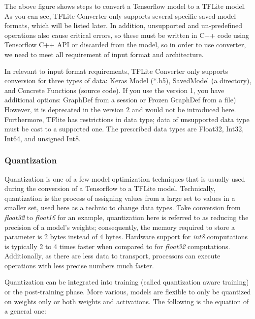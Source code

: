 The above figure shows steps to convert a Tensorflow model to a TFLite model. As you can see, TFLite Converter only supports several specific saved model formats, which will be listed later. In addition, unsupported and un-predefined operations also cause critical errors, so these must be written in C++ code using Tensorflow C++ API or discarded from the model, so in order to use converter, we need to meet all requirement of input format and architecture.\par 

In relevant to input format requirements, TFLite Converter only supports conversion for three types of data: Keras Model (*.h5), SavedModel (a directory), and Concrete Functions (source code). If you use the version 1, you have additional options: GraphDef from a session or Frozen GraphDef from a file) However, it is deprecated in the version 2 and would not be introduced here. Furthermore, TFlite has restrictions in data type; data of unsupported data type must be cast to a supported one. The prescribed data types are Float32, Int32, Int64, and unsigned Int8. \par


\subsubsection{Quantization} \label{subsec:quantization}
Quantization is one of a few model optimization techniques that is usually used during the conversion of a Tensorflow to a TFLite model. Technically, quantization is the process of assigning values from a large set to values in a smaller set, used here as a technic to change data types. Take conversion from \emph{float32} to \emph{float16} for an example, quantization here is referred to as reducing the precision of a model’s weights; consequently, the memory required to store a parameter is 2 bytes instead of 4 bytes. Hardware support for \emph{int8} computations is typically 2 to 4 times faster when compared to for \emph{float32} computations. Additionally, as there are less data to transport, processors can execute operations with less precise numbers much faster. \par

Quantization can be integrated into training (called quantization aware training) or the post-training phase. More various, models are flexible to only be quantized on weights only or both weights and activations. The following is the equation of a general one: \par


